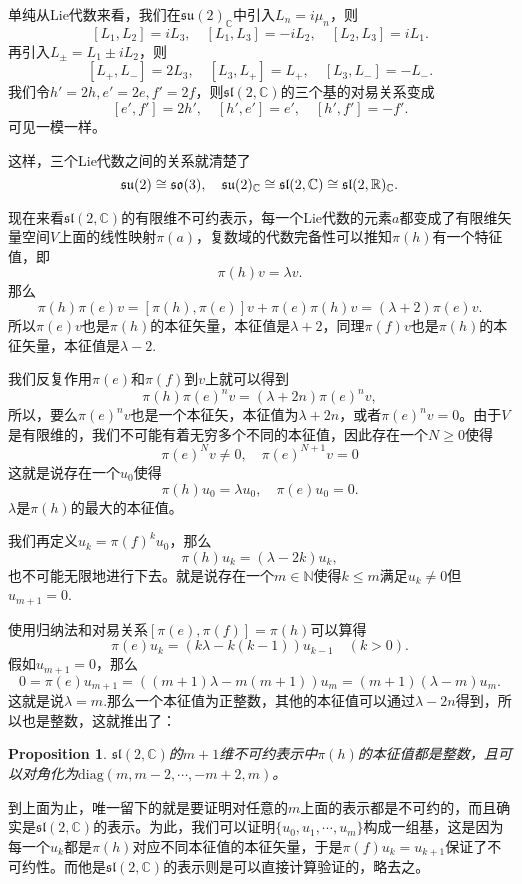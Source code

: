 \documentclass[8pt]{book}
\theoremstyle{plain}
\newtheorem{pro}[defi]{Proposition}
\newcommand{\cc}{\mathbb{C}}
\begin{document}
单纯从Lie代数来看，我们在$\mathfrak{su}(2)_\cc$中引入$L_n=i\mu_n$，则
\[
	[L_1,L_2]=iL_3,\quad [L_1,L_3]=-iL_2,\quad [L_2,L_3]=iL_1.
\]
再引入$L_\pm=L_1\pm iL_2$，则
\[
	[L_+,L_-]=2L_3,\quad [L_3,L_+]=L_+,\quad [L_3,L_-]=-L_-.
\]
我们令$h'=2h,e'=2e,f'=2f$，则$\mathfrak{sl}(2,\cc)$的三个基的对易关系变成
\[
[e',f']=2h',\quad[h',e']=e',\quad[h',f']=-f'.
\]
可见一模一样。

这样，三个Lie代数之间的关系就清楚了
\[
	\mathfrak{su}(2)\cong\mathfrak{so}(3),\quad \mathfrak{su}(2)_\cc\cong \mathfrak{sl}(2,\mathbb{C}) \cong\mathfrak{sl}(2,\rr)_\cc.
\]

现在来看$\mathfrak{sl}(2,\mathbb{C})$的有限维不可约表示，每一个Lie代数的元素$a$都变成了有限维矢量空间$V$上面的线性映射$\pi(a)$，复数域的代数完备性可以推知$\pi(h)$有一个特征值，即
\[
	\pi(h)v=\lambda v.
\]
那么
\[
	\pi(h)\pi(e)v=[\pi(h),\pi(e)]v+\pi(e)\pi(h)v=(\lambda+2)\pi(e)v.
\]
所以$\pi(e)v$也是$\pi(h)$的本征矢量，本征值是$\lambda+2$，同理$\pi(f)v$也是$\pi(h)$的本征矢量，本征值是$\lambda-2$.

我们反复作用$\pi(e)$和$\pi(f)$到$v$上就可以得到
\[
	\pi(h)\pi(e)^nv=(\lambda+2n)\pi(e)^nv,
\]
所以，要么$\pi(e)^nv$也是一个本征矢，本征值为$\lambda+2n$，或者$\pi(e)^nv=0$。由于$V$是有限维的，我们不可能有着无穷多个不同的本征值，因此存在一个$N\geq 0$使得
\[
	\pi(e)^Nv\neq 0,\quad \pi(e)^{N+1}v=0
\]
这就是说存在一个$u_0$使得
\[
	\pi(h)u_0=\lambda u_0,\quad \pi(e)u_0=0.
\]
$\lambda$是$\pi(h)$的最大的本征值。

我们再定义$u_k=\pi(f)^ku_0$，那么
\[
	\pi(h)u_k=(\lambda-2k) u_k,
\]
也不可能无限地进行下去。就是说存在一个$m\in \mathbb{N}$使得$k\leq m$满足$u_k\neq 0$但$u_{m+1}=0$.

使用归纳法和对易关系$[\pi(e),\pi(f)]=\pi(h)$可以算得
\[
\pi(e)u_k=(k\lambda -k(k-1)) u_{k-1}\quad (k>0).
\]
假如$u_{m+1}=0$，那么
\[
0=\pi(e)u_{m+1}=((m+1)\lambda -m(m+1)) u_{m}=(m+1)(\lambda-m)u_{m}.
\]
这就是说$\lambda=m$.那么一个本征值为正整数，其他的本征值可以通过$\lambda-2n$得到，所以也是整数，这就推出了：
\begin{pro}
$\mathfrak{sl}(2,\mathbb{C})$的$m+1$维不可约表示中$\pi(h)$的本征值都是整数，且可以对角化为$\mathrm{diag}(m,m-2,\cdots,-m+2,m)$。
\end{pro}
到上面为止，唯一留下的就是要证明对任意的$m$上面的表示都是不可约的，而且确实是$\mathfrak{sl}(2,\mathbb{C})$的表示。为此，我们可以证明$\{u_0,u_1,\cdots,u_m\}$构成一组基，这是因为每一个$u_k$都是$\pi(h)$对应不同本征值的本征矢量，于是$\pi(f)u_k=u_{k+1}$保证了不可约性。而他是$\mathfrak{sl}(2,\mathbb{C})$的表示则是可以直接计算验证的，略去之。
\end{document}
